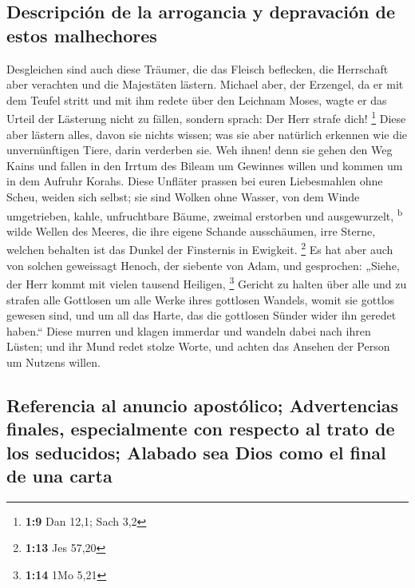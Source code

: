 \hypertarget{descripciuxf3n-de-la-arrogancia-y-depravaciuxf3n-de-estos-malhechores}{%
\subsection{Descripción de la arrogancia y depravación de estos
malhechores}\label{descripciuxf3n-de-la-arrogancia-y-depravaciuxf3n-de-estos-malhechores}}

 Desgleichen sind auch diese Träumer, die das Fleisch
beflecken, die Herrschaft aber verachten und die Majestäten lästern.
 Michael aber, der Erzengel, da er mit dem Teufel stritt
und mit ihm redete über den Leichnam Moses, wagte er das Urteil der
Lästerung nicht zu fällen, sondern sprach: Der Herr strafe dich!
\footnote{\textbf{1:9} Dan 12,1; Sach 3,2}  Diese aber
lästern alles, davon sie nichts wissen; was sie aber natürlich erkennen
wie die unvernünftigen Tiere, darin verderben sie.  Weh
ihnen! denn sie gehen den Weg Kains und fallen in den Irrtum des Bileam
um Gewinnes willen und kommen um in dem Aufruhr Korahs. 
Diese Unfläter prassen bei euren Liebesmahlen ohne Scheu, weiden sich
selbst; sie sind Wolken ohne Wasser, von dem Winde umgetrieben, kahle,
unfruchtbare Bäume, zweimal erstorben und ausgewurzelt,
\textsuperscript{b}  wilde Wellen des Meeres, die ihre
eigene Schande ausschäumen, irre Sterne, welchen behalten ist das Dunkel
der Finsternis in Ewigkeit. \footnote{\textbf{1:13} Jes 57,20}
 Es hat aber auch von solchen geweissagt Henoch, der
siebente von Adam, und gesprochen: „Siehe, der Herr kommt mit vielen
tausend Heiligen, \footnote{\textbf{1:14} 1Mo 5,21} 
Gericht zu halten über alle und zu strafen alle Gottlosen um alle Werke
ihres gottlosen Wandels, womit sie gottlos gewesen sind, und um all das
Harte, das die gottlosen Sünder wider ihn geredet haben.``
 Diese murren und klagen immerdar und wandeln dabei nach
ihren Lüsten; und ihr Mund redet stolze Worte, und achten das Ansehen
der Person um Nutzens willen.

\hypertarget{referencia-al-anuncio-apostuxf3lico-advertencias-finales-especialmente-con-respecto-al-trato-de-los-seducidos-alabado-sea-dios-como-el-final-de-una-carta}{%
\subsection{Referencia al anuncio apostólico; Advertencias finales,
especialmente con respecto al trato de los seducidos; Alabado sea Dios
como el final de una
carta}\label{referencia-al-anuncio-apostuxf3lico-advertencias-finales-especialmente-con-respecto-al-trato-de-los-seducidos-alabado-sea-dios-como-el-final-de-una-carta}}


